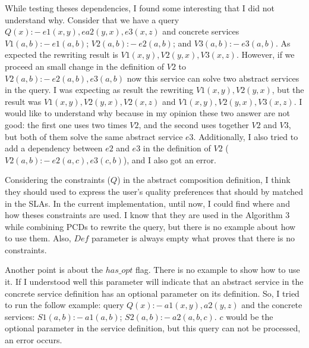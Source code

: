 \documentclass[12pt,a4paper,oneside]{report}
\begin{document}
\bigskip
While testing theses dependencies, I found some interesting that I did not understand why. Consider that we have a query $Q(x) :-  \ e1(x,y),ea2(y,x),e3(x,z)$ and concrete services $V1(a,b) :- \ e1(a,b)$; $V2(a,b) :- \ e2(a,b)$; and $V3(a,b) :- \ e3(a,b)$. As expected the rewriting result is $V1(x,y),V2(y,x),V3(x,z)$. However, if we proceed an small change in the definition of $V2$ to $V2(a,b) :- \ e2(a,b),e3(a,b)$ now this service can solve two abstract services in the query. I was expecting as result the rewriting $V1(x,y),V2(y,x)$, but the result was $V1(x,y),V2(y,x),V2(x,z)$ and $V1(x,y),V2(y,x),V3(x,z)$. I would like to understand why because in my opinion these two answer are not good: the first one uses two times $V2$, and the second uses together $V2$ and $V3$, but both of them solve the same abstract service $e3$. 
Additionally, I also tried to add a dependency between $e2$ and $e3$ in the definition of $V2$ ($V2(a,b) :- \ e2(a,c),e3(c,b)$), and I also got an error.

\bigskip
Considering the constraints ($Q$) in the abstract composition definition, I think they should used to express the user's quality preferences that should by matched in the SLAs. In the current implementation, until now, I could find where and how theses constraints are used. I know that they are used in the Algorithm 3~\cite{ba} while combining PCDs to rewrite the query, but there is no example about how to use them. Also, \textbf{$Def$} parameter is always empty what proves that there is no constraints.

\bigskip
Another point is about the $has\_opt$ flag. There is no example to show how to use it. If I understood well this parameter will indicate that an abstract service in the concrete service definition has an optional parameter on its definition. So, I tried to run the follow example: query $Q(x) :-  \ a1(x,y),a2(y,z)$ and the concrete services: $S1(a,b) :- \ a1(a,b)$; $S2(a,b) :- \ a2(a,b,c)$. $c$ would be the optional parameter in the service definition, but this query can not be processed, an error occurs.

 

\end{document}
